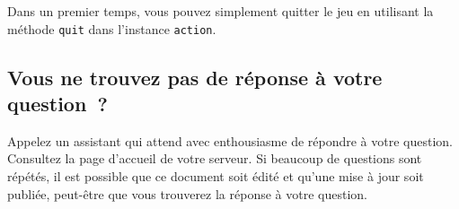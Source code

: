 Dans un premier temps, vous pouvez simplement quitter le jeu en utilisant la méthode \texttt{quit} dans l'instance \texttt{action}.

\subsection[Autres précisions]{Vous ne trouvez pas de réponse à votre question~?}

Appelez un assistant qui attend avec enthousiasme de répondre à votre question.\\

Consultez la page d'accueil de votre serveur. Si beaucoup de questions sont répétés, il est possible que ce document soit édité et qu'une mise à jour soit publiée, peut-être que vous trouverez la réponse à votre question.